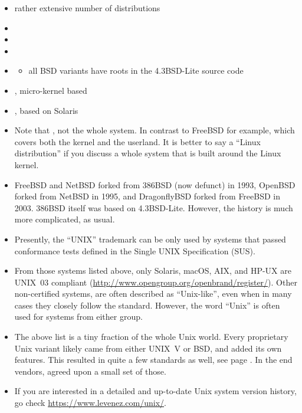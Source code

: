 \begin{slide}

\begin{itemize}
\item rather extensive number of  distributions
\item {}
\item {}
\item {}
\item {}
\begin{itemize}
\item all BSD variants have roots in the 4.3BSD-Lite source code
\end{itemize}
\item {}, micro-kernel based
\item {}, based on Solaris
\end{itemize}
\end{slide}

\begin{itemize}
\item Note that , not the whole system.  In contrast to
FreeBSD for example, which covers both the kernel and the userland.  It is
better to say a ``Linux distribution'' if you discuss a whole system that is
built around the Linux kernel.
\item FreeBSD and NetBSD forked from 386BSD (now defunct) in 1993, OpenBSD
forked from NetBSD in 1995, and DragonflyBSD forked from FreeBSD in 2003.
386BSD itself was based on 4.3BSD-Lite.  However, the history is much more
complicated, as usual.
\item Presently, the ``UNIX'' trademark can be only used by systems that passed
conformance tests defined in the Single UNIX Specification (SUS).
\item From those systems listed above, only Solaris, macOS, AIX, and HP-UX are
UNIX~03 compliant (\url{http://www.opengroup.org/openbrand/register/}).  Other
non-certified systems, are often described as ``Unix-like'', even when in many
cases they closely follow the standard.  However, the word ``Unix'' is often used
for systems from either group.
\item The above list is a tiny fraction of the whole Unix world.  Every
proprietary Unix variant likely came from either UNIX~V or BSD, and added its
own features.  This resulted in quite a few standards as well, see page
\pageref{UNIXSTANDARDS}.  In the end vendors, agreed upon a small set of those.
\item If you are interested in a detailed and up-to-date Unix system version
history, go check \url{https://www.levenez.com/unix/}.
\end{itemize}


